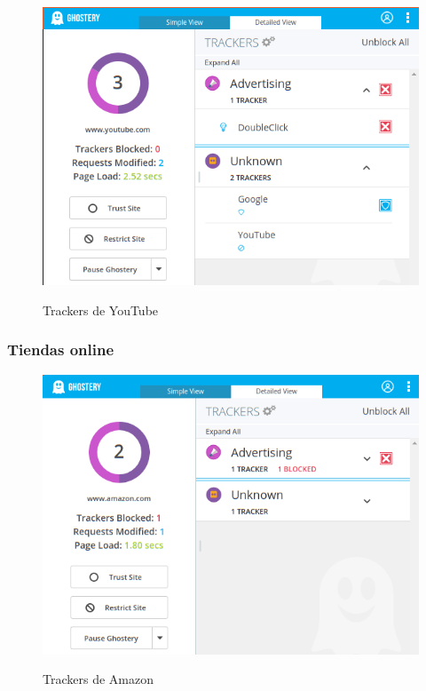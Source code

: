 \documentclass[10pt,a4paper]{article}
\begin{document}
\begin{figure}[H]
  \centering
  \includegraphics[scale=0.6]{ghost_youtube.png}\\
  \caption{Trackers de YouTube}
  \label{fig:object}
\end{figure}

\subsubsection*{Tiendas online}

\begin{figure}[H]
  \centering
  \includegraphics[scale=0.6]{ghost_amazon.png}\\
  \caption{Trackers de Amazon}
  \label{fig:object}
\end{figure}
\end{document}
